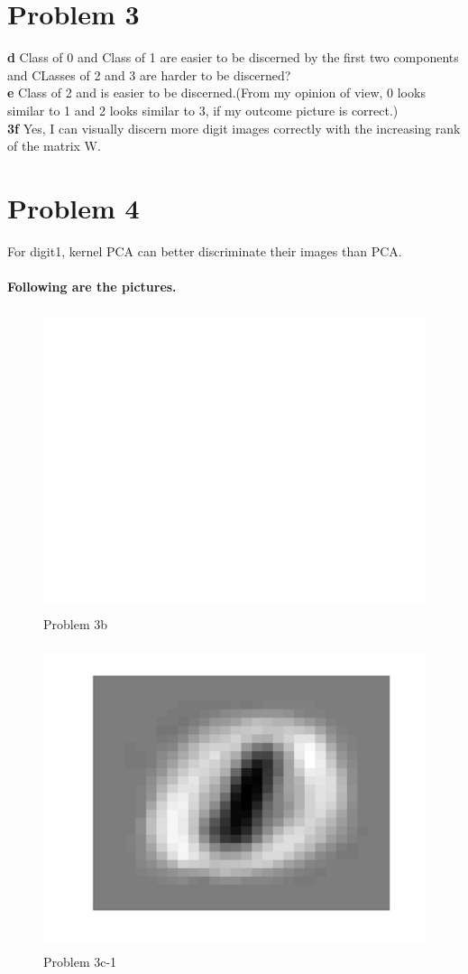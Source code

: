 \documentclass[11pt]{scrartcl}
\begin{document}
\section*{Problem 3}
\textbf{d}
Class of 0 and Class of 1 are easier to be discerned by the first two components and CLasses of 2 and 3 are harder to be discerned?\\
\textbf{e}
Class of 2 and is easier to be discerned.(From my opinion of view, 0 looks similar to 1 and 2 looks similar to 3, if my outcome picture is correct.)\\
\textbf{3f}
Yes, I can visually discern more digit images correctly with the
increasing rank of the matrix W.
\section*{Problem 4}
For digit1, kernel PCA can better discriminate their images than PCA.\\
\\
\LARGE{\textbf{Following are the pictures.}}
\begin{figure} 

	\includegraphics[width=5.5in,height=3.5in]{digit_image_3b.jpg}
	\caption{Problem 3b}
\end{figure}
\begin{figure} 

	\includegraphics[width=5.5in,height=3.5in]{digit_image_3c1.jpg}
	\caption{Problem 3c-1}
\end{figure}
\end{document}

